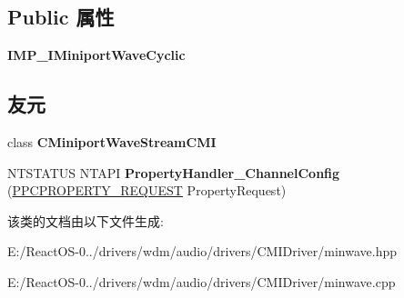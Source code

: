 \subsection*{Public 属性}
\begin{DoxyCompactItemize}
\item 
\mbox{\label{class_c_miniport_wave_c_m_i_ab8effaeab7656e65502e03a2f02a20b4}} 
{\bfseries I\+M\+P\+\_\+\+I\+Miniport\+Wave\+Cyclic}
\end{DoxyCompactItemize}
\subsection*{友元}
\begin{DoxyCompactItemize}
\item 
\mbox{\label{class_c_miniport_wave_c_m_i_af259f065587a3dea196f4955e82938c2}} 
class {\bfseries C\+Miniport\+Wave\+Stream\+C\+MI}
\item 
\mbox{\label{class_c_miniport_wave_c_m_i_add15cec3773062708fbe3a81c52776d5}} 
N\+T\+S\+T\+A\+T\+US N\+T\+A\+PI {\bfseries Property\+Handler\+\_\+\+Channel\+Config} (\hyperlink{struct___p_c_p_r_o_p_e_r_t_y___r_e_q_u_e_s_t}{P\+P\+C\+P\+R\+O\+P\+E\+R\+T\+Y\+\_\+\+R\+E\+Q\+U\+E\+ST} Property\+Request)
\end{DoxyCompactItemize}


该类的文档由以下文件生成\+:\begin{DoxyCompactItemize}
\item 
E\+:/\+React\+O\+S-\/0../drivers/wdm/audio/drivers/\+C\+M\+I\+Driver/minwave.\+hpp\item 
E\+:/\+React\+O\+S-\/0../drivers/wdm/audio/drivers/\+C\+M\+I\+Driver/minwave.\+cpp\end{DoxyCompactItemize}
